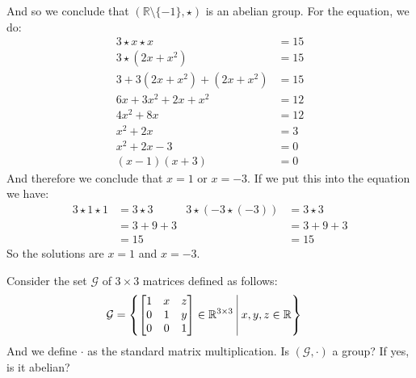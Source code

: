 \documentclass[final,expand]{problemset}
\begin{document}
{	And so we conclude that $(\mathbb{R} \setminus \{-1\}, \star)$ is an abelian group. For the equation, we do:
	\begin{align*}
		3 \star x \star x &= 15\\
		3 \star (2x + x^2) &= 15\\
		3 + 3(2x + x^2) + (2x + x^2) &= 15\\
		6x + 3x^2 + 2x + x^2 &= 12\\
		4x^2 + 8x &= 12\\
		x^2 + 2x &= 3\\
		x^2 + 2x - 3 &= 0\\
		(x -1)(x+3) &= 0 
	\end{align*}
	And therefore we conclude that $x = 1$ or $x = -3$. If we put this into the equation we have:
	\begin{align*}
		3 \star 1 \star 1 &= 3 \star 3 & 3 \star (-3 \star (-3)) &= 3 \star 3\\
		&= 3 + 9 + 3 & &= 3 + 9 + 3\\
		&= 15 & &= 15
	\end{align*}
	So the solutions are $x = 1$ and $x = -3$.
}

\problem Consider the set $\mathcal{G}$ of $3 \times 3$ matrices defined as follows:
\begin{align*}
	\mathcal{G} &= \left\{\begin{bmatrix}1 & x & z\\ 0 & 1 & y\\ 0 & 0 & 1 \end{bmatrix} \in \mathbb{R}^{3 \times 3} \, \, \vline \, \, x, y, z \in \mathbb{R}\right\}
\end{align*}
And we define $\cdot$ as the standard matrix multiplication. Is $(\mathcal{G}, \cdot)$ a group? If yes, is it abelian?
\end{document}
